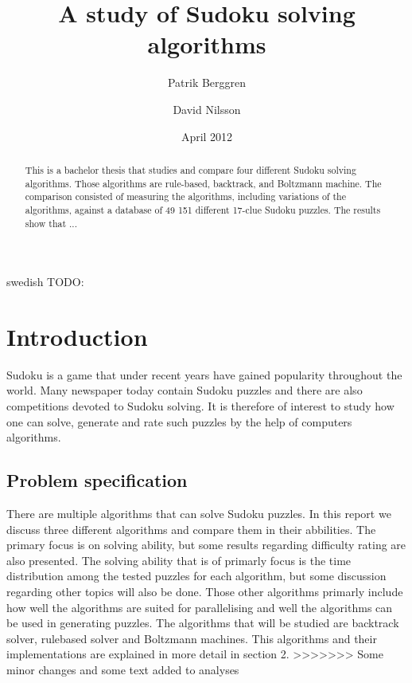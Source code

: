 \documentclass[a4paper,11pt]{kth-mag}
\title{A study of Sudoku solving algorithms}
\subtitle{}
\author{Patrik Berggren \and David Nilsson}
\date{April 2012}
\begin{document}
\frontmatter
\pagestyle{empty}
\removepagenumbers
\maketitle
{}
\begin{abstract}
This is a bachelor thesis that studies and compare four different Sudoku
solving algorithms.
Those algorithms are rule-based, backtrack, and Boltzmann machine.
 The comparison consisted of measuring the algorithms, including
variations of the algorithms, against a database of 49 151 different 17-clue Sudoku
puzzles.
The results show that ...
\end{abstract}
\clearpage
\begin{foreignabstract}{swedish}
TODO: 
\end{foreignabstract}
\clearpage
\tableofcontents*
\mainmatter
\pagestyle{newchap}

\chapter{Introduction}
Sudoku is a game that under recent years have gained popularity throughout the world.
Many newspaper today contain Sudoku puzzles and there are also competitions devoted 
to Sudoku solving.
It is therefore of interest to study how one can solve, generate and rate such puzzles by the help of computers algorithms.

\section{Problem specification}
There are multiple algorithms that can solve Sudoku puzzles.
In this report we discuss three different algorithms and compare them in their abbilities.
The primary focus is on solving ability, but some results regarding difficulty rating are also presented.
The solving ability that is of primarly focus is the time distribution among the tested puzzles for each algorithm, but some discussion regarding other topics will also be done.
Those other algorithms primarly include how well the algorithms are suited for parallelising and well the algorithms can be used in generating puzzles.
The algorithms that will be studied are backtrack solver, rulebased solver and Boltzmann machines. 
This algorithms and their implementations are explained in more detail in section 2. 
>>>>>>> Some minor changes and some text added to analyses
\end{document}
